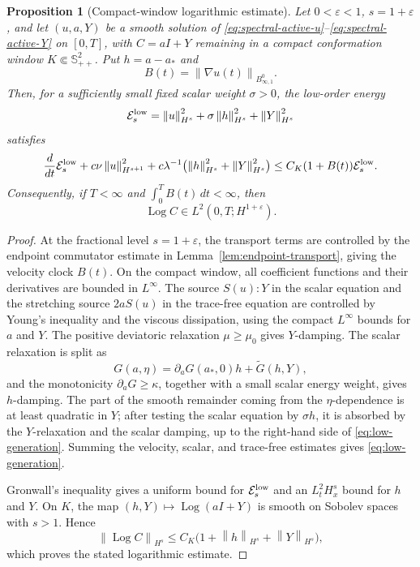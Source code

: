 \documentclass[11pt]{article}
\newtheorem{proposition}{Proposition}[section]
\newcommand{\Spp}{\mathbb S_{++}}
\newcommand{\Log}{\operatorname{Log}}
\newcommand{\calE}{\mathcal E}
\newcommand{\eps}{\varepsilon}
\newcommand{\norm}[1]{\left\lVert #1\right\rVert}
\newcommand{\Besov}{B^0_{\infty,1}}
\begin{document}
\begin{proposition}[Compact-window logarithmic estimate]
\label{prop:compact-window-log-generation}
Let \(0<\eps<1\), \(s=1+\eps\), and let \((u,a,Y)\) be a smooth solution of
\eqref{eq:spectral-active-u}--\eqref{eq:spectral-active-Y} on \([0,T]\), with
\(C=aI+Y\) remaining in a compact conformation window
\(K\Subset\Spp^2\).  Put \(h=a-a_*\) and
\[
  B(t)=\norm{\nabla u(t)}_{\Besov}.
\]
Then, for a sufficiently small fixed scalar weight \(\sigma>0\), the low-order
energy
\[
  \calE_s^{\rm low}
  =\norm{u}_{H^s}^2+\sigma\norm{h}_{H^s}^2+\norm{Y}_{H^s}^2
\]
satisfies
\[
  \frac{d}{dt}\calE_s^{\rm low}
  +c\nu\norm{u}_{H^{s+1}}^2
  +c\lambda^{-1}\bigl(\norm{h}_{H^s}^2+\norm{Y}_{H^s}^2\bigr)
  \le
  C_K(1+B(t))\calE_s^{\rm low}.
  \label{eq:low-generation}
\]
Consequently, if \(T<\infty\) and \(\int_0^TB(t)\,dt<\infty\), then
\[
  \Log C\in L^2(0,T;H^{1+\eps}).
\]
\end{proposition}

\begin{proof}
At the fractional level \(s=1+\eps\), the transport terms are controlled by
the endpoint commutator estimate in Lemma~\ref{lem:endpoint-transport}, giving
the velocity clock \(B(t)\).  On the compact window, all coefficient functions
and their derivatives are bounded in \(L^\infty\).  The source \(S(u):Y\) in
the scalar equation and the stretching source \(2aS(u)\) in the trace-free
equation are controlled by Young's inequality and the viscous dissipation,
using the compact \(L^\infty\) bounds for \(a\) and \(Y\).  The positive
deviatoric relaxation \(\mu\ge\mu_0\) gives \(Y\)-damping.  The scalar
relaxation is split as
\[
  G(a,\eta)=\partial_aG(a_*,0)h+\widetilde G(h,Y),
\]
and the monotonicity \(\partial_aG\ge\kappa\), together with a small scalar
energy weight, gives \(h\)-damping.  The part of the smooth remainder coming
from the \(\eta\)-dependence is at least quadratic in \(Y\); after testing the
scalar equation by \(\sigma h\), it is absorbed by the \(Y\)-relaxation and
the scalar damping, up to the right-hand side of \eqref{eq:low-generation}.
Summing the velocity, scalar, and trace-free estimates gives
\eqref{eq:low-generation}.

Gronwall's inequality gives a uniform bound for \(\calE_s^{\rm low}\) and an
\(L^2_tH^s_x\) bound for \(h\) and \(Y\).  On \(K\), the map
\((h,Y)\mapsto\Log(aI+Y)\) is smooth on Sobolev spaces with \(s>1\).  Hence
\[
  \norm{\Log C}_{H^s}
  \le C_K\bigl(1+\norm{h}_{H^s}+\norm{Y}_{H^s}\bigr),
\]
which proves the stated logarithmic estimate.
\end{proof}
\end{document}
